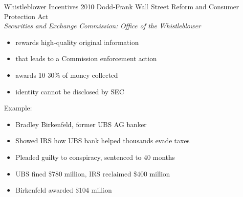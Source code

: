 \documentclass{beamer}
\begin{document}
\begin{frame}{Whistleblower Incentives}
2010 Dodd-Frank Wall Street Reform and Consumer Protection Act\\
\emph{Securities and Exchange Commission: Office of the Whistleblower}
\begin{itemize}
\item rewards high-quality original information
\item that leads to a Commission enforcement action
\item awards 10-30\% of money collected
\item identity cannot be disclosed by SEC
\end{itemize}
\bigskip
Example: %
\begin{itemize}
\item Bradley Birkenfeld, former UBS AG banker
\item Showed IRS how UBS bank helped thousands evade taxes
\item Pleaded guilty to conspiracy, sentenced to 40 months
\item UBS fined \$780 million, IRS reclaimed \$400 million
\item Birkenfeld awarded \$104 million
\end{itemize}
\end{frame}
\end{document}
